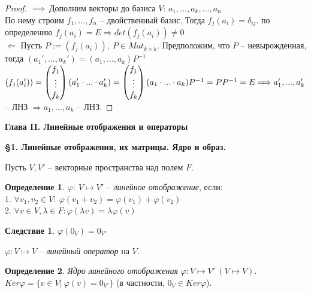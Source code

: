 \documentclass[a4paper, 12pt]{article}
\theoremstyle{definition}
\newtheorem*{definition}{Определение}
\newtheorem*{consequense}{Следствие}
\begin{document}
    \begin{proof}
        $\\\Longrightarrow$ Дополним векторы до базиса $V$:
        $a_1,..., a_k,..., a_n$\\ По нему строим $f_1,...,f_n$
        -- двойственный базис. Тогда $f_j(a_i) = \delta_{ij}.$
        по определению $f_j(a_i) = E \Longrightarrow det(f_j(a_i))
        \neq 0$\\$\Longleftarrow$ Пусть $P := (f_j(a_i)),\ 
        P \in Mat_{k\times k}$. Предположим, что $P$ --
        невырожденная, тогда $(a_1',..., a_k') = (a_1,..., a_k)
        P^{-1}$\\$(f_j(a_i')) =
        \begin{pmatrix}f_1\\\vdots\\f_k\end{pmatrix}
        (a_1'\cdot ...\cdot a_k') = \begin{pmatrix}f_1\\\vdots\\f_k\end{pmatrix}
        (a_1\cdot ...\cdot a_k)P^{-1} = PP^{-1} = E
        \Longrightarrow\\\\ a_1',...,a_k'$ -- ЛНЗ
        $\Longrightarrow a_1,..., a_k$ -- ЛНЗ.

    \end{proof}
    \newpage
    \begin{center}
        \begin{Large}
            \textbf{Глава II. Линейные отображения и операторы}
            
            \textbf{\S1. Линейные отображения, их матрицы.
            Ядро и образ.}
        \end{Large}
    \end{center}
    Пусть $V, V'$ -- векторные пространства над полем $F$.
    \begin{definition}
        $\varphi:\ V \longmapsto V'$ -- \textit{линейное отображение},
        если:\\1. $\forall v_1, v_2 \in V:\ \varphi(v_1 + v_2) =
        \varphi(v_1) + \varphi(v_2)$\\2. $\forall v \in V,
        \lambda \in F: \varphi(\lambda v) = \lambda \varphi(v)$
    \end{definition}
    \begin{consequense}
        $\varphi(0_V) = 0_{V'}$
    \end{consequense}$
    \varphi: V \longmapsto V$ -- \textit{линейный оператор} на $V$.
    \begin{definition}
        \textit{Ядро линейного отображения} $\varphi: V
        \longmapsto V'\ (V \longmapsto V).$
        \\$Ker \varphi = \{v \in V|\ \varphi(v) = 0_{V'}\}$
        (в частности, $0_V \in Ker\varphi$).
    \end{definition}
\end{document}
